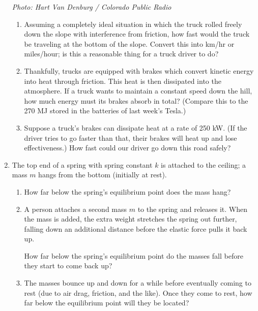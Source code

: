 \documentclass[12pt]{article}
\begin{document}
\begin{enumerate}
\begin{minipage}{4in}
\begin{center}
\tiny \it Photo: Hart Van Denburg / Colorado Public Radio

\end{center}
\end{minipage}
\medskip



\begin{enumerate}
	\item Assuming a completely ideal situation in which the truck rolled freely down the slope with interference from friction, how fast would the truck be traveling at the bottom of the slope. Convert this into km/hr or miles/hour; is this a reasonable thing for a truck driver to do?
	
	\item Thankfully, trucks are equipped with brakes which convert kinetic energy into heat through friction. This heat is then dissipated into the atmosphere. If a truck wants to maintain a constant speed down the hill, how much energy must its brakes absorb in total? (Compare this to the 270 MJ stored in the batteries of last week's Tesla.)
	
	\item Suppose a truck's brakes can dissipate heat at a rate of 250 kW. (If the driver tries to go faster than that, their brakes will heat up and lose effectiveness.) How fast could our driver go down this road safely? 
	
\end{enumerate}

\newpage


\item The top end of a spring with spring constant $k$ is attached to the ceiling; a mass $m$ hangs from the bottom (initially at rest). 

\begin{enumerate}
	\item How far below the spring's equilibrium point does the mass hang?
	\item A person attaches a second mass $m$ to the spring and releases it. When the mass is added, the extra weight stretches the spring out further,
	falling down an additional distance before the elastic force pulls it back up.
	
How far below the spring's equilibrium point do the masses fall before they start to come back up?

\item The masses bounce up and down for a while before eventually
coming to rest (due to air drag, friction, and the like).
Once they come to rest, how far below the equilibrium point
will they be located?
\end{enumerate}


\end{enumerate}
\end{document}
